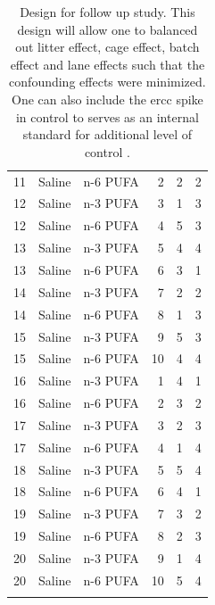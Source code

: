 \begin{center}
\begin{longtable}[H]{rrrrrr}
			    11    & Saline & n-6 PUFA & 2     & 2     & 2 \\
			    12    & Saline & n-3 PUFA & 3     & 1     & 3 \\
			    12    & Saline & n-6 PUFA & 4     & 5     & 3 \\
			    13    & Saline & n-3 PUFA & 5     & 4     & 4 \\
			    13    & Saline & n-6 PUFA & 6     & 3     & 1 \\
			    14    & Saline & n-3 PUFA & 7     & 2     & 2 \\
			    14    & Saline & n-6 PUFA & 8     & 1     & 3 \\
			    15    & Saline & n-3 PUFA & 9     & 5     & 3 \\
			    15    & Saline & n-6 PUFA & 10    & 4     & 4 \\
			    16    & Saline & n-3 PUFA & 1     & 4     & 1 \\
			    16    & Saline & n-6 PUFA & 2     & 3     & 2 \\
			    17    & Saline & n-3 PUFA & 3     & 2     & 3 \\
			    17    & Saline & n-6 PUFA & 4     & 1     & 4 \\
			    18    & Saline & n-3 PUFA & 5     & 5     & 4 \\
			    18    & Saline & n-6 PUFA & 6     & 4     & 1 \\
			    19    & Saline & n-3 PUFA & 7     & 3     & 2 \\
			    19    & Saline & n-6 PUFA & 8     & 2     & 3 \\
			    20    & Saline & n-3 PUFA & 9     & 1     & 4 \\
			    20    & Saline & n-6 PUFA & 10    & 5     & 4 \\
			\bottomrule
		\caption[Design for Follow Up Study]{
			Design for follow up study.
			This design will allow one to balanced out litter effect, cage effect, batch effect and lane effects such that the confounding effects were minimized.
			One can also include the \gls{ercc} spike in control to serves as an internal standard for additional level of control \citep{Jiang2011a}.
			}
		\label{tab:bestdesign}%
	\end{longtable}%
\end{center}
